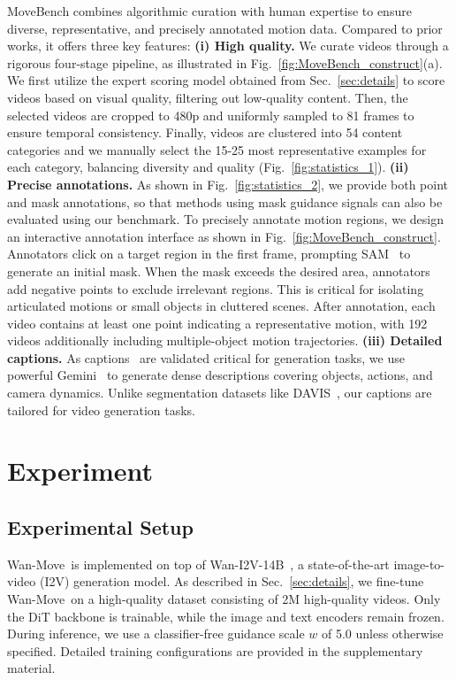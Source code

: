 \documentclass{article}
\newcommand{\method}{Wan-Move}
\begin{document}
MoveBench combines algorithmic curation with human expertise to ensure diverse, representative, and precisely annotated motion data.
Compared to prior works, it offers three key features: \textbf{(i) High quality.} We curate videos through a rigorous four-stage pipeline, as illustrated in Fig.~\ref{fig:MoveBench_construct}(a). We first utilize the expert scoring model obtained from Sec.~\ref{sec:details} to score videos based on visual quality, filtering out low-quality content. Then, the selected videos are cropped to 480p and uniformly sampled to 81 frames to ensure temporal consistency. Finally, videos are clustered into 54 content categories and we manually select the 15-25 most representative examples for each category, balancing diversity and quality (Fig.~\ref{fig:statistics_1}).
\textbf{(ii) Precise annotations.} As shown in Fig.~\ref{fig:statistics_2}, we provide both point and mask annotations, so that methods using mask guidance signals can also be evaluated using our benchmark. To precisely annotate motion regions, we design an interactive annotation interface as shown in Fig.~\ref{fig:MoveBench_construct}. Annotators click on a target region in the first frame, prompting SAM~\cite{sam} to generate an initial mask. When the mask exceeds the desired area, annotators add negative points to exclude irrelevant regions. This is critical for isolating articulated motions or small objects in cluttered scenes.
After annotation, each video contains at least one point indicating a representative motion, with 192 videos additionally including multiple-object motion trajectories.
\textbf{(iii) Detailed captions.} As captions~\cite{ren2025anycap,wang2025inserter,wang2025mmsu} are validated critical for generation tasks, we use powerful Gemini~\cite{team2023gemini} to generate dense descriptions covering objects, actions, and camera dynamics. Unlike segmentation datasets like DAVIS~\cite{pont2017davis}, our captions are tailored for video generation tasks.

\section{Experiment}
\subsection{Experimental Setup} \label{sec:experimental_setup}
\method~is implemented on top of Wan-I2V-14B~\cite{wan}, a state-of-the-art image-to-video (I2V) generation model. As described in Sec.~\ref{sec:details}, we fine-tune \method~on a high-quality dataset consisting of 2M high-quality videos. Only the DiT backbone is trainable, while the image and text encoders remain frozen. During inference, we use a classifier-free guidance scale $w$ of 5.0 unless otherwise specified. Detailed training configurations are provided in the supplementary material.
\end{document}
